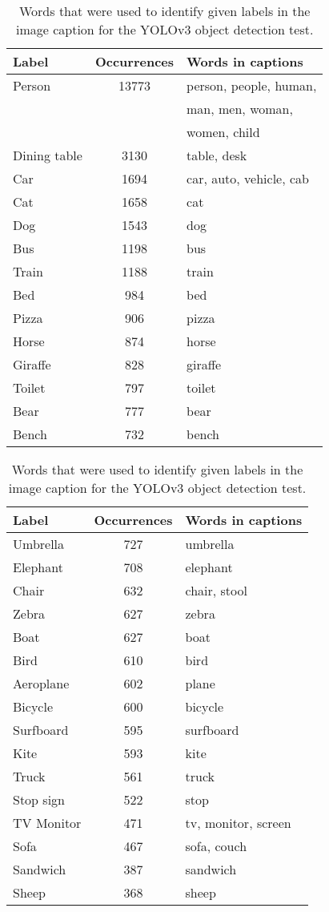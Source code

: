 \documentclass{article} \usepackage{iclr2019_conference,times}
\begin{document}
\begin{table}[t]
	\setlength{\tabcolsep}{0.6em}
	\centering\small
	\begin{tabular}{@{}l | c | l@{}}
		\toprule
		Label & Occurrences & Words in captions \\
		\midrule
		Person & 13773 & person, people, human, \\ & & man, men, woman, \\ & & women, child \\
		Dining table & 3130 & table, desk \\
		Car & 1694 & car, auto, vehicle, cab \\
		Cat & 1658 & cat \\
		Dog & 1543 & dog \\
		Bus & 1198 & bus \\
		Train & 1188 & train \\
		Bed & 984 & bed \\
		Pizza & 906 & pizza \\
		Horse & 874 & horse \\
		Giraffe & 828 & giraffe \\
		Toilet & 797 & toilet \\
		Bear & 777 & bear \\
		Bench & 732 & bench \\
		\bottomrule
	\end{tabular}
	\hspace{1.0em}
	\begin{tabular}{@{}l | c | l@{}}
		\toprule
		Label & Occurrences & Words in captions \\
		\midrule
		Umbrella & 727 & umbrella \\
		Elephant & 708 & elephant \\
		Chair & 632 & chair, stool \\
		Zebra & 627 & zebra \\
		Boat & 627 & boat \\
		Bird & 610 & bird \\
		Aeroplane & 602 & plane \\
		Bicycle & 600 & bicycle \\
		Surfboard & 595 & surfboard \\
		Kite & 593 & kite \\
		Truck & 561 & truck \\
		Stop sign & 522 & stop \\
		TV Monitor & 471 & tv, monitor, screen \\
		Sofa & 467 & sofa, couch \\
		Sandwich & 387 & sandwich \\
		Sheep & 368 & sheep \\
		\bottomrule
	\end{tabular}
	\caption{Words that were used to identify given labels in the image caption for the YOLOv3 object detection test.}
	\label{app:table:label-words}
\end{table}
\end{document}
